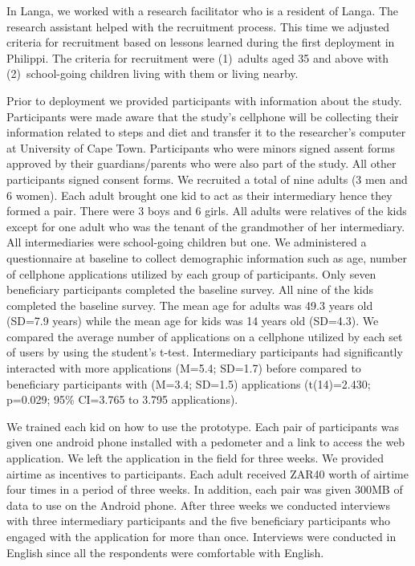\documentclass{sig-alternate}
\begin{document}
In Langa, we worked with a research facilitator who is a resident of Langa. The research assistant helped with the recruitment process. This time we adjusted criteria for recruitment based on lessons learned during the first deployment in Philippi. The criteria for recruitment were (1)~adults aged 35 and above with (2)~school-going 
children living with them or living nearby.

Prior to deployment we provided participants with information about the study.
Participants were made aware that the study's cellphone will be collecting
their information related to steps and diet and transfer it to the
researcher's computer at University of Cape Town. Participants who were minors
signed assent forms approved by their guardians/parents who were also part of
the study. All other participants signed consent forms.   We recruited a total
of nine adults (3 men and 6 women). Each adult brought one kid to act as their
intermediary hence they formed a pair. There were 3 boys and 6 girls. All
adults were relatives of the kids except for one adult who was the tenant of
the grandmother of her intermediary. All intermediaries were school-going
children but one.  We administered a questionnaire at baseline to collect
demographic information such as age, number of cellphone applications utilized by each group of participants. Only seven beneficiary participants completed the
baseline survey. All nine of the kids completed the baseline survey. The mean age
for adults was 49.3 years old (SD=7.9 years) while the mean age for kids
was 14 years old (SD=4.3). We compared the average number of applications on a cellphone utilized by each set of users by using the student's t-test. Intermediary participants had significantly interacted with more applications (M=5.4; SD=1.7) before
compared to beneficiary participants with (M=3.4; SD=1.5) applications
(t(14)=2.430; p=0.029; 95\% CI=3.765 to 3.795 applications). 

We trained each kid on how to use the prototype. Each pair of participants was
given one android phone installed with a pedometer and a link to access the
web application. We left the application in the field for three weeks. We
provided airtime as incentives to participants. Each adult received ZAR40
worth of airtime four times in a period of three weeks. In addition,
each pair was given 300MB of data to use on the Android phone. After three
weeks we conducted interviews with three intermediary participants and the five
beneficiary participants who engaged with the application for more than once.
Interviews were conducted in English since all the respondents were
comfortable with English.
\end{document}
